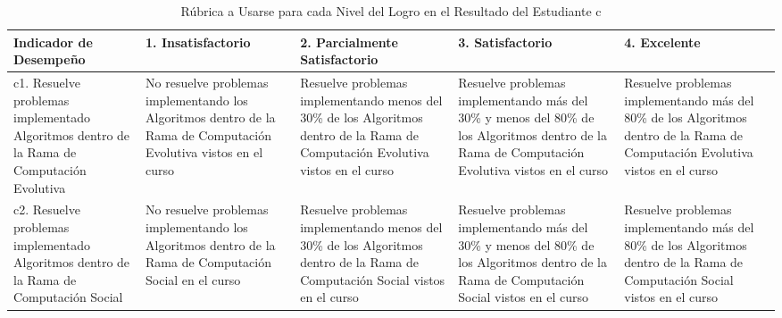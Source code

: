 \begin{landscape}
\begin{table}[h]
\centering
\begin{tabular}{C{5cm}|C{4cm}|C{4cm}|C{4cm}|C{4cm}}
\hline
\textbf{Indicador de Desempeño} & 
\textbf{1. Insatisfactorio} & 
\textbf{2. Parcialmente Satisfactorio} & 
\textbf{3. Satisfactorio} & 
\textbf{4. Excelente} 
\\ \hline
c1. Resuelve problemas implementado Algoritmos dentro de la Rama de Computación Evolutiva &
No resuelve problemas implementando los Algoritmos dentro de la Rama de Computación Evolutiva vistos en el curso &
Resuelve problemas implementando menos del 30\% de los Algoritmos dentro de la Rama de Computación Evolutiva vistos en el curso &
Resuelve problemas implementando más del 30\% y menos del 80\% de los Algoritmos dentro de la Rama de Computación Evolutiva vistos en el curso &
Resuelve problemas implementando más del 80\% de los Algoritmos dentro de la Rama de Computación Evolutiva vistos en el curso
\\ \hline
c2. Resuelve problemas implementado Algoritmos dentro de la Rama de Computación Social &
No resuelve problemas implementando los Algoritmos dentro de la Rama de Computación Social en el curso &
Resuelve problemas implementando menos del 30\% de los Algoritmos dentro de la Rama de Computación Social vistos en el curso &
Resuelve problemas implementando más del 30\% y menos del 80\% de los Algoritmos dentro de la Rama de Computación Social vistos en el curso &
Resuelve problemas implementando más del 80\% de los Algoritmos dentro de la Rama de Computación Social vistos en el curso
\\ \hline
\end{tabular}
\caption{Rúbrica a Usarse para cada Nivel del Logro en el Resultado del Estudiante \lbrack c\rbrack}
\label{tab:nivel_rubrica_c} 
\end{table}

\newpage


\end{landscape}
